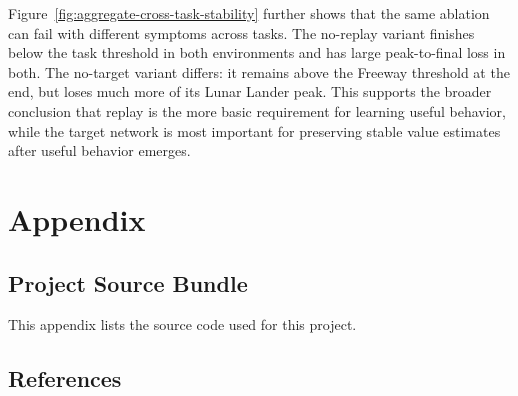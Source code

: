 \documentclass[12pt]{article}
\begin{document}
Figure~\ref{fig:aggregate-cross-task-stability} further shows that the same ablation can fail with different symptoms across tasks. The no-replay variant finishes below the task threshold in both environments and has large peak-to-final loss in both. The no-target variant differs: it remains above the Freeway threshold at the end, but loses much more of its Lunar Lander peak. This supports the broader conclusion that replay is the more basic requirement for learning useful behavior, while the target network is most important for preserving stable value estimates after useful behavior emerges.

\clearpage
\appendix
\section{Appendix}
\subsection{Project Source Bundle}

This appendix lists the source code used for this project.



\clearpage

\subsection{References}

\begingroup
\renewcommand{\section}[2]{}


\endgroup
\end{document}

